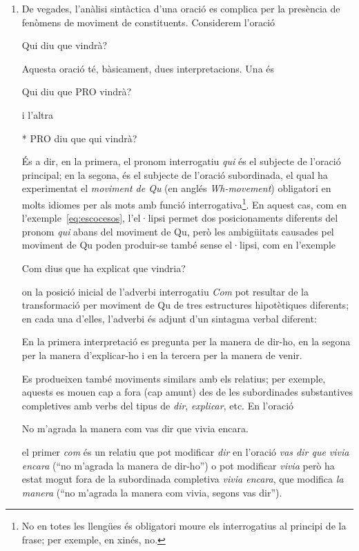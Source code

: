 \begin{enumerate}
\item De vegades, l'anàlisi sintàctica d'una oració es complica per la
  presència de fenòmens de moviment de constituents. Considerem
  l'oració
\begin{example}
Qui diu que vindrà?
\end{example}
Aquesta oració té, bàsicament, dues interpretacions. Una és
\begin{example}
Qui diu que PRO vindrà?
\end{example}
i l'altra
\begin{example}
* PRO diu que qui vindrà?
\end{example}
És a dir, en la primera, el pronom interrogatiu \emph{qui} és el
subjecte de l'oració principal; en la segona, és el subjecte de
l'oració subordinada, el qual ha experimentat el \emph{moviment de Qu}
(en anglés \emph{Wh-movement}) obligatori en molts idiomes per als
mots amb funció interrogativa\footnote{No en totes les llengües és
  obligatori moure els interrogatius al principi de la frase; per
  exemple, en xinés, no.}. En aquest cas, com en
l'exemple~\ref{eq:escocesos}, l'el·lipsi permet dos posicionaments
diferents del pronom \emph{qui} abans del moviment de Qu, però les
ambigüitats causades pel moviment de Qu poden produir-se també sense
el·lipsi, com en l'exemple
\begin{exemple}
Com dius que ha explicat que vindria?
\end{exemple}
on la posició inicial de l'adverbi interrogatiu \emph{Com} pot
resultar de la transformació per moviment de Qu de tres estructures
hipotètiques diferents; en cada una d'elles, l'adverbi és adjunt d'un
sintagma verbal diferent:
  En la primera interpretació es pregunta per la manera de dir-ho, en
  la segona per la manera d'explicar-ho i en la tercera per la manera
  de venir.
  
  Es produeixen també moviments similars amb els relatius; per
  exemple, aquests es mouen cap a fora (cap amunt) des de les
  subordinades substantives completives amb verbs del tipus de {\em
    dir}, \emph{explicar}, etc. En l'oració
\begin{example}
No m'agrada la manera com vas dir que vivia encara.
\end{example}
el primer \emph{com} és un relatiu que pot modificar \emph{dir} en
  l'oració \emph{vas dir que vivia encara} (``no m'agrada la manera de
  dir-ho'')  o pot modificar  {\em
  vivia} però ha estat mogut fora de la subordinada completiva \emph{vivia encara}, que modifica {\em
  la manera} (``no m'agrada la manera com vivia, segons vas dir'').






\end{enumerate}
